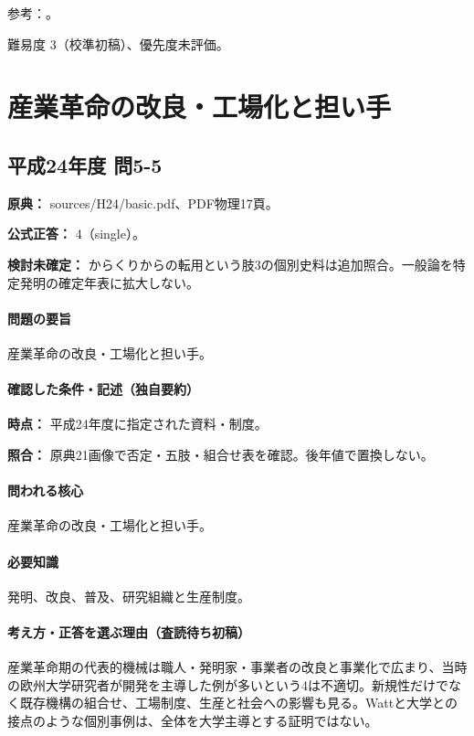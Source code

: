 \par 参考：\cite{env58_curie}。

\par 難易度 3（校準初稿）、優先度未評価。

\section{産業革命の改良・工場化と担い手}

\subsection{平成24年度 問5-5}
\label{q:h24-reg-basic-5-5}

\noindent\textbf{原典：} sources/H24/basic.pdf、PDF物理17頁。

\textbf{公式正答：} 4（single）。

\par\textbf{検討未確定：} からくりからの転用という肢3の個別史料は追加照合。一般論を特定発明の確定年表に拡大しない。

\paragraph{問題の要旨} 産業革命の改良・工場化と担い手。

\paragraph{確認した条件・記述（独自要約）}\mbox{}\par

\noindent\textbf{時点：} 平成24年度に指定された資料・制度。\par

\noindent\textbf{照合：} 原典21画像で否定・五肢・組合せ表を確認。後年値で置換しない。\par

\paragraph{問われる核心} 産業革命の改良・工場化と担い手。

\paragraph{必要知識} 発明、改良、普及、研究組織と生産制度。

\paragraph{考え方・正答を選ぶ理由（査読待ち初稿）} 産業革命期の代表的機械は職人・発明家・事業者の改良と事業化で広まり、当時の欧州大学研究者が開発を主導した例が多いという4は不適切。新規性だけでなく既存機構の組合せ、工場制度、生産と社会への影響も見る。Wattと大学との接点のような個別事例は、全体を大学主導とする証明ではない。

